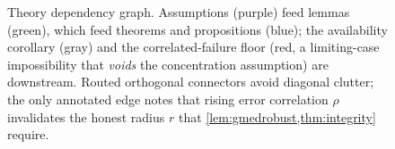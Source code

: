 \begin{figure}[t]
{}
\caption{Theory dependency graph. Assumptions (purple) feed lemmas (green), which feed
theorems and propositions (blue); the availability corollary (gray) and the correlated-failure
floor (red, a limiting-case impossibility that \emph{voids} the concentration assumption)
are downstream. Routed orthogonal connectors avoid diagonal clutter; the only annotated
edge notes that rising error correlation $\rho$ invalidates the honest radius $r$ that
\cref{lem:gmedrobust,thm:integrity} require.}
\label{fig:theory}
\end{figure}
